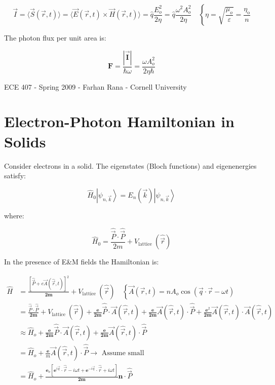 \documentclass[10pt]{article}
\begin{document}
$$
\vec{I}=\langle\vec{S}(\vec{r}, t)\rangle=\langle\vec{E}(\vec{r}, t) \times \vec{H}(\vec{r}, t)\rangle=\hat{q} \frac{E_{o}^{2}}{2 \eta}=\hat{q} \frac{\omega^{2} A_{o}^{2}}{2 \eta} \quad\left\{\eta=\sqrt{\frac{\mu_{o}}{\varepsilon}}=\frac{\eta_{\mathrm{o}}}{n}\right.
$$

The photon flux per unit area is:

$$
\boldsymbol{F}=\frac{|\overrightarrow{\boldsymbol{I}}|}{\hbar \omega}=\frac{\omega A_{o}^{2}}{2 \eta \hbar}
$$

ECE 407 - Spring 2009 - Farhan Rana - Cornell University

\section*{Electron-Photon Hamiltonian in Solids}
Consider electrons in a solid. The eigenstates (Bloch functions) and eigenenergies satisfy:

$$
\hat{H}_{0}\left|\psi_{n, \vec{k}}\right\rangle=E_{n}(\vec{k})\left|\psi_{n, \vec{k}}\right\rangle
$$

where:

$$
\hat{H}_{0}=\frac{\hat{\vec{P}} \cdot \hat{\vec{P}}}{2 m}+V_{\text {lattice }}(\hat{\vec{r}})
$$

In the presence of E\&M fields the Hamiltonian is:

$$
\begin{aligned}
\hat{H} & =\frac{[\hat{\vec{P}}+e \vec{A}(\hat{\vec{r}}, t)]^{2}}{\mathbf{2 m}}+V_{\text {lattice }}(\hat{\vec{r}}) \quad\left\{\vec{A}(\vec{r}, t)=\hat{n} A_{o} \cos (\vec{q} \cdot \vec{r}-\omega t)\right. \\
& =\frac{\hat{\vec{P}} \cdot \hat{\vec{P}}}{\mathbf{2 m}}+V_{\text {lattice }}(\hat{\vec{r}})+\frac{\mathbf{e}}{\mathbf{2 m}} \hat{\vec{P}} \cdot \vec{A}(\hat{\vec{r}}, t)+\frac{\mathbf{e}}{\mathbf{2 m}} \vec{A}(\hat{\vec{r}}, t) \cdot \hat{\vec{P}}+\frac{\mathbf{e}^{2}}{\mathbf{2 m}} \vec{A}(\hat{\vec{r}}, t) \cdot \vec{A}(\hat{\vec{r}}, t) \\
& \approx \hat{H}_{o}+\frac{\mathbf{e}}{\mathbf{2 m}} \hat{\vec{P}} \cdot \vec{A}(\hat{\vec{r}}, t)+\frac{\mathbf{e}}{\mathbf{2 m}} \vec{A}(\hat{\vec{r}}, t) \cdot \hat{\vec{P}} \\
& =\hat{H}_{o}+\frac{\mathbf{e}}{m} \vec{A}(\hat{\vec{r}}, t) \cdot \hat{\vec{P}} \longrightarrow \text { Assume small } \\
& =\hat{H}_{o}+\frac{\mathbf{e}_{o}\left[\mathbf{e}^{i \vec{q}} \cdot \hat{\vec{r}}-i \omega t+\mathbf{e}^{-i \vec{q}} \cdot \hat{\vec{r}}+i \omega t\right]}{\mathbf{2 m}} \hat{\boldsymbol{n}} \cdot \hat{\vec{P}}
\end{aligned}
$$
\end{document}
